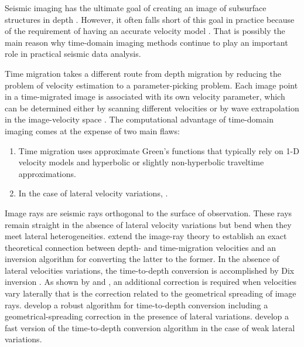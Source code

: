 \documentclass[manuscript]{geophysics}
\begin{document}
Seismic imaging has the ultimate goal of creating an image of
subsurface structures in depth
\cite[]{GEO66-05-16221640,bednar2005brief,biondi,etgen}. However, it often falls
short of this goal in practice because of the requirement of having an
accurate velocity model \cite[]{landa,landa2}. That is possibly the
main reason why time-domain imaging methods continue to play an important role in practical seismic
data analysis.

Time migration takes a different route from depth migration by
reducing the problem of velocity estimation to a
parameter-picking problem. Each image point in a time-migrated
image is associated with its own velocity parameter, which can be
determined either by scanning different velocities
\cite[]{GEO66-06-16991713} or by wave extrapolation in the
image-velocity space \cite[]{fomel2003time}. The computational
advantage of time-domain imaging comes at the expense of two main
flaws:
\begin{enumerate}
\item Time migration uses approximate Green's functions  that typically
  rely on 1-D velocity models and hyperbolic or slightly
  non-hyperbolic traveltime approximations.
\item In the case of lateral velocity variations,  \cite[]{hubral1977time}.
\end{enumerate}

Image rays are seismic rays orthogonal to the surface of
observation. These rays remain straight in the absence of lateral
velocity variations but bend when they meet lateral heterogeneities.
\cite{ip,cameron2008time,jcp} extend the image-ray theory to establish an exact
theoretical connection between depth- and time-migration velocities
and an inversion algorithm for converting the latter to the former. In
the absence of lateral velocities variations, the time-to-depth
conversion is accomplished by Dix
inversion \cite{GEO20-01-00680086}. As shown by \cite{ip} and
\cite{tygel}, an additional correction is required when velocities
vary laterally that is the correction related to the geometrical spreading
of image rays. \cite{siwei,siwei2} develop a robust algorithm for
time-to-depth conversion including a geometrical-spreading correction
in the presence of lateral variations. \cite{sripanich2018fast} develop a fast version of the time-to-depth conversion algorithm in the case of weak lateral variations. 
\end{document}
